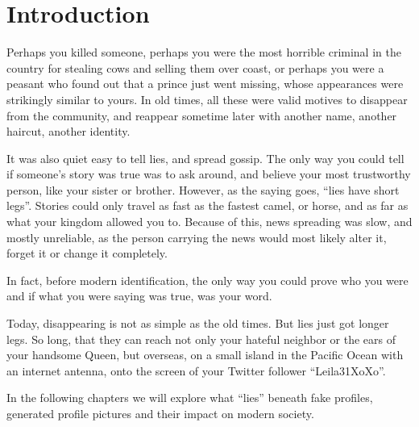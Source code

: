 \section{Introduction}

Perhaps you killed someone, perhaps you were the most horrible criminal in the country for stealing cows and selling them over coast, or perhaps you were a peasant who found out that a prince just went missing, whose appearances were strikingly similar to yours. In old times, all these were valid motives to disappear from the community, and reappear sometime later with another name, another haircut, another identity.

It was also quiet easy to tell lies, and spread gossip. The only way you could tell if someone's story was true was to ask around, and believe your most trustworthy person, like your sister or brother. However, as the saying goes, ``lies have short legs''. Stories could only travel as fast as the fastest camel, or horse, and as far as what your kingdom allowed you to. Because of this, news spreading was slow, and mostly unreliable, as the person carrying the news would most likely alter it, forget it or change it completely.

In fact, before modern identification, the only way you could prove who you were and if what you were saying was true, was your word.

Today, disappearing is not as simple as the old times. But lies just got longer legs. So long, that they can reach not only your hateful neighbor or the ears of your handsome Queen, but overseas, on a small island in the Pacific Ocean with an internet antenna, onto the screen of your Twitter follower ``Leila31XoXo''.

In the following chapters we will explore what ``lies'' beneath fake profiles, generated profile pictures and their impact on modern society.

